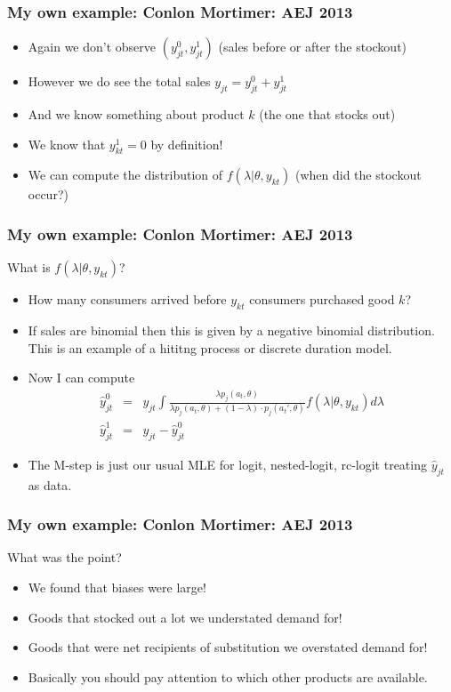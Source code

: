 \documentclass[xcolor=pdftex,dvipsnames,table,mathserif]{beamer}
\begin{document}
\begin{frame}
\frametitle{My own example: Conlon Mortimer: AEJ 2013}
\begin{itemize}
\item Again we don't observe $(y_{jt}^0,y_{jt}^1)$ (sales before or after the stockout)
\item However we do see the total sales $y_{jt} = y_{jt}^0+ y_{jt}^1$
\item And we know something about product $k$ (the one that stocks out)
\item We know that $y_{kt}^{1} = 0$ by definition!
\item We can compute the distribution of $f(\lambda | \theta, y_{kt})$ (when did the stockout occur?)
\end{itemize}
\end{frame}

\begin{frame}
\frametitle{My own example: Conlon Mortimer: AEJ 2013}
What is $f(\lambda | \theta, y_{kt})$?
\begin{itemize}
\item How many consumers arrived before $y_{kt}$ consumers purchased good $k$?
\item If sales are binomial then this is given by a \alert{negative binomial} distribution. This is an example of a \alert{hititng process} or \alert{discrete duration model}.
\item Now I can compute 
\begin{eqnarray*}
\hat{y}_{jt}^{0} &=&y_{jt} \int \frac{\lambda p_j(a_t,\theta)}{\lambda p_j(a_t,\theta) +(1-\lambda)\cdot p_j(a_t',\theta)} f(\lambda | \theta, y_{kt}) d \lambda \\
\hat{y}_{jt}^{1} &=&y_{jt} -\hat{y}_{jt}^{0} 
\end{eqnarray*}
\item The M-step is just our usual MLE for logit, nested-logit, rc-logit treating $\hat{y}_{jt}$ as data.
\end{itemize}
\end{frame}

\begin{frame}
\frametitle{My own example: Conlon Mortimer: AEJ 2013}
What was the point?
\begin{itemize}
\item We found that biases were large!
\item Goods that stocked out a lot we understated demand for!
\item Goods that were net recipients of substitution we overstated demand for!
\item Basically you should pay attention to which other products are available.
\end{itemize}
\end{frame}
\end{document}
